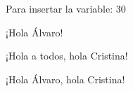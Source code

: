 \documentclass{article}
\begin{document}

\newcommand{\x}{30}

Para insertar la variable: {\x}




\newcommand{\saludar}[1] {  %
    ¡Hola #1!
}

\saludar{Álvaro} %


\newcommand{\saludarPorDefecto}[2][Álvaro] { %
    ¡Hola #1, hola #2!
}


\saludarPorDefecto[a todos]{Cristina}  %

\saludarPorDefecto{Cristina}           %

\end{document}
